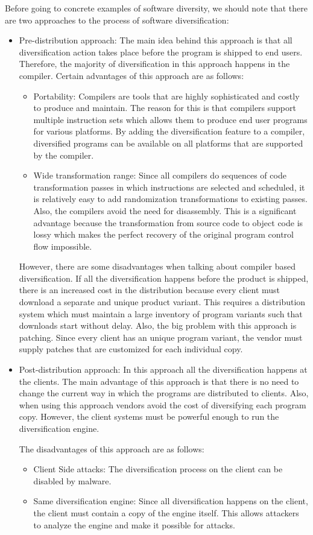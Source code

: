 \documentclass[11pt,final,conference,a4paper]{IEEEtran}
\begin{document}
Before going to concrete examples of software diversity, we should note that there are two approaches to the process of software diversification:
\begin{itemize}
\item Pre-distribution approach: The main idea behind this approach is that all diversification action takes place before the program is shipped to end users. Therefore, the majority of diversification in this approach happens in the compiler. Certain advantages of this approach are as follows:
\begin{itemize}
\item Portability: Compilers are tools that are highly sophisticated and costly to produce and maintain. The reason for this is that compilers support multiple instruction sets which allows them to produce end user programs for various platforms. By adding the diversification feature to a compiler, diversified programs can be available on all platforms that are supported by the compiler.
\item Wide transformation range: Since all compilers do sequences of code transformation passes in which instructions are selected and scheduled, it is relatively easy to add randomization transformations to existing passes. Also, the compilers avoid the need for disassembly. This is a significant advantage because the transformation from source code to object code is lossy which makes the perfect recovery of the original program control flow impossible.
\end{itemize}
However, there are some disadvantages when talking about compiler based diversification. If all the diversification happens before the product is shipped, there is an increased cost in the distribution because every client must download a separate and unique product variant. This requires a distribution system which must maintain a large inventory of program variants such that downloads start without delay. Also, the big problem with this approach is patching. Since every client has an unique program variant, the vendor must supply patches that are customized for each individual copy.
\item Post-distribution approach: In this approach all the diversification happens at the clients. The main advantage of this approach is that there is no need to change the current way in which the programs are distributed to clients. Also, when using this approach vendors avoid the cost of diversifying each program copy. However, the client systems must be powerful enough to run the diversification engine.

The disadvantages of this approach are as follows:
\begin{itemize}
\item Client Side attacks: The diversification process on the client can be disabled by malware.
\item Same diversification engine: Since all diversification happens on the client, the client must contain a copy of the engine itself. This allows attackers to analyze the engine and make it possible for attacks.
\end{itemize}
\end{itemize}
\end{document}
